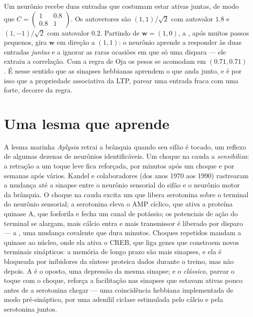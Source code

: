 \begin{example}\label{ex:b3:learning-memory:two-inputs}
Um neurônio recebe duas entradas que costumam estar ativas juntas, de
modo que $C =
\begin{pmatrix} 1 & 0.8 \\ 0.8 & 1\end{pmatrix}$. Os
autovetores são $(1,1)/\sqrt{2}$ com autovalor $1.8$ e $(1,-1)/\sqrt{2}$
com autovalor $0.2$. Partindo de $\mathbf{w} = (1, 0)$, a ,
após muitos passos pequenos, gira $\mathbf{w}$ em direção a $(1,1)$: o
neurônio aprende a responder às duas entradas \emph{juntas} e a ignorar
as raras ocasiões em que só uma dispara --- ele extraiu a correlação.
Com a regra de Oja os pesos se acomodam em $(0.71, 0.71)$. É nesse
sentido que as sinapses hebbianas aprendem o que anda junto, e é por
isso que a propriedade associativa da LTP, parear uma entrada fraca com
uma forte, decorre da regra.
\end{example}

\section{Uma lesma que aprende}

\begin{proposition}\label{prop:b3:learning-memory:aplysia}
A lesma marinha \emph{Aplysia} retrai a brânquia quando seu sifão é
tocado, um reflexo de algumas dezenas de neurônios identificáveis. Um
choque na cauda a \emph{sensibiliza}: a retração a um toque leve fica
reforçada, por minutos após um choque e por semanas após vários. Kandel
e colaboradores (dos anos 1970 aos 1990) rastrearam a mudança até a
sinapse entre o neurônio sensorial do sifão e o neurônio motor da
brânquia. O choque na cauda excita um  que libera
serotonina sobre o terminal do neurônio sensorial; a serotonina eleva o
AMP cíclico, que ativa a proteína quinase A, que fosforila e fecha um
canal de potássio; os potenciais de ação do terminal se alargam, mais
cálcio entra e mais transmissor é liberado por disparo --- a
\emph{}, uma mudança covalente que dura
minutos. Choques repetidos mandam a quinase ao núcleo, onde ela ativa o
CREB, que liga genes que constroem novos terminais sinápticos: a memória
de longo prazo são mais sinapses, e ela é bloqueada por inibidores da
síntese proteica dados durante o treino, mas não depois. A
\emph{} é o oposto, uma depressão da mesma sinapse; e o
\emph{ clássico}, parear o toque com o choque, reforça a
facilitação nas sinapses que estavam ativas pouco antes de a serotonina
chegar --- uma coincidência hebbiana implementada de modo
pré-sináptico, por uma adenilil ciclase estimulada pelo cálcio e pela
serotonina juntos.
\end{proposition}


